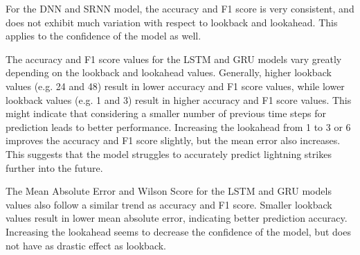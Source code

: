 For the DNN and SRNN model, the accuracy and F1 score is very consistent, and does not exhibit much variation with respect to lookback and lookahead. This applies to the confidence of the model as well.

The accuracy and F1 score values for the LSTM and GRU models vary greatly depending on the lookback and lookahead values. Generally, higher lookback values (e.g. 24 and 48) result in lower accuracy and F1 score values, while lower lookback values (e.g. 1 and 3) result in higher accuracy and F1 score values. This might indicate that considering a smaller number of previous time steps for prediction leads to better performance. Increasing the lookahead from 1 to 3 or 6 improves the accuracy and F1 score slightly, but the mean error also increases. This suggests that the model struggles to accurately predict lightning strikes further into the future.

The Mean Absolute Error and Wilson Score for the LSTM and GRU models values also follow a similar trend as accuracy and F1 score. Smaller lookback values result in lower mean absolute error, indicating better prediction accuracy. Increasing the lookahead seems to decrease the confidence of the model, but does not have as drastic effect as lookback.

